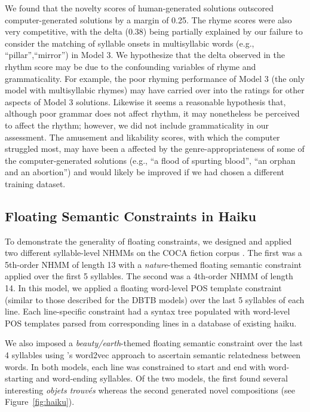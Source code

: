\documentclass[phd,electronic,oneside,twosidetoc,letterpaper,chaptercenter,parttop,lof,lot]{byumsphd}
\begin{document}
We found that the novelty scores of human-generated solutions outscored computer-generated solutions by a margin of 0.25. The rhyme scores were also very competitive, with the delta (0.38) being partially explained by our failure to consider the matching of syllable onsets in multisyllabic words (e.g., ``pillar'',``mirror'') in Model 3. We hypothesize that the delta observed in the rhythm score may be due to the confounding variables of rhyme and grammaticality. For example, the poor rhyming performance of Model 3 (the only model with multisyllabic rhymes) may have carried over into the ratings for other aspects of Model 3 solutions. Likewise it seems a reasonable hypothesis that, although poor grammar does not affect rhythm, it may nonetheless be perceived to affect the rhythm; however, we did not include grammaticality in our assessment. The amusement and likability scores, with which the computer struggled most, may have been a affected by the genre-appropriateness of some of the computer-generated solutions (e.g., ``a flood of spurting blood'', ``an orphan and an abortion'') and would likely be improved if we had chosen a different training dataset.

\subsection{Floating Semantic Constraints in Haiku}

To demonstrate the generality of floating constraints, we designed and applied two different syllable-level NHMMs on the COCA fiction corpus \cite{davies2009385+}. The first was a 5th-order NHMM of length 13 with a \textit{nature}-themed floating semantic constraint applied over the first 5 syllables. The second was a 4th-order NHMM of length 14. In this model, we applied a floating word-level POS template constraint (similar to those described for the DBTB models) over the last 5 syllables of each line. Each line-specific constraint had a syntax tree populated with word-level POS templates parsed from corresponding lines in a database of existing haiku. 

We also imposed a \textit{beauty/earth}-themed floating semantic constraint over the last 4 syllables using \citeauthor{mikolov2013distributed}'s word2vec approach \cite{mikolov2013distributed} to ascertain semantic relatedness between words. In both models, each line was constrained to start and end with word-starting and word-ending syllables. Of the two models, the first found several interesting \textit{objets trouv\'es} whereas the second generated novel compositions (see Figure~\ref{fig:haiku}).
\end{document}
